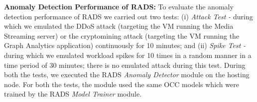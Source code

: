\textbf{Anomaly Detection Performance of RADS:}
To evaluate the anomaly detection performance of RADS we carried out two tests: (i) \textit{Attack Test -} during which we emulated the DDoS attack (targeting the VM running the Media Streaming server) or the cryptomining attack (targeting the VM running the Graph Analytics application) continuously for 10 minutes; and (ii) \textit{Spike Test -} during which we emulated workload spikes for 10 times in a random manner in a time period of 30 minutes; there is no emulated attack during this test.
During both the tests, we executed the RADS \textit{Anomaly Detector} module on the hosting node. 
For both the tests, the module used the same OCC models which were trained by the RADS \textit{Model Trainer} module. 

